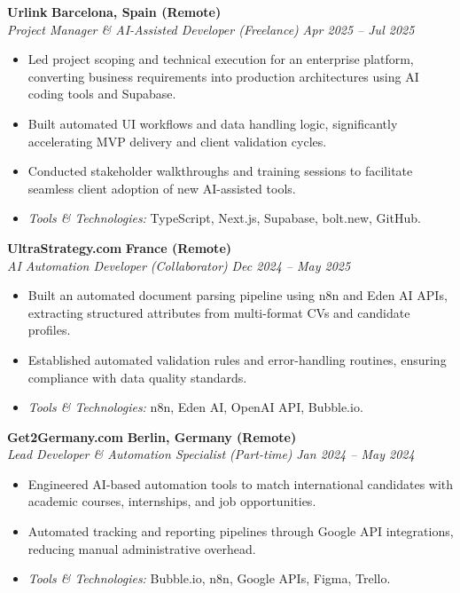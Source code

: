 \documentclass[10pt,a4paper]{article}
\newcommand{\cvexperience}[4]{%
  \noindent\textbf{#1} \hfill \textbf{#2}\\%
  \noindent\textit{#3} \hfill \textit{#4}%
  \vspace{2pt}%
}
\begin{document}
\vspace{4pt}
\cvexperience{Urlink}{Barcelona, Spain (Remote)}{Project Manager \& AI-Assisted Developer (Freelance)}{Apr 2025 -- Jul 2025}
\begin{itemize}[leftmargin=*, noitemsep, topsep=2pt, parsep=1pt]
  \item Led project scoping and technical execution for an enterprise platform, converting business requirements into production architectures using AI coding tools and Supabase.
  \item Built automated UI workflows and data handling logic, significantly accelerating MVP delivery and client validation cycles.
  \item Conducted stakeholder walkthroughs and training sessions to facilitate seamless client adoption of new AI-assisted tools.
  \item \textit{Tools \& Technologies:} TypeScript, Next.js, Supabase, bolt.new, GitHub.
\end{itemize}

\vspace{4pt}
\cvexperience{UltraStrategy.com}{France (Remote)}{AI Automation Developer (Collaborator)}{Dec 2024 -- May 2025}
\begin{itemize}[leftmargin=*, noitemsep, topsep=2pt, parsep=1pt]
  \item Built an automated document parsing pipeline using n8n and Eden AI APIs, extracting structured attributes from multi-format CVs and candidate profiles.
  \item Established automated validation rules and error-handling routines, ensuring compliance with data quality standards.
  \item \textit{Tools \& Technologies:} n8n, Eden AI, OpenAI API, Bubble.io.
\end{itemize}

\vspace{4pt}
\cvexperience{Get2Germany.com}{Berlin, Germany (Remote)}{Lead Developer \& Automation Specialist (Part-time)}{Jan 2024 -- May 2024}
\begin{itemize}[leftmargin=*, noitemsep, topsep=2pt, parsep=1pt]
  \item Engineered AI-based automation tools to match international candidates with academic courses, internships, and job opportunities.
  \item Automated tracking and reporting pipelines through Google API integrations, reducing manual administrative overhead.
  \item \textit{Tools \& Technologies:} Bubble.io, n8n, Google APIs, Figma, Trello.
\end{itemize}
\end{document}
